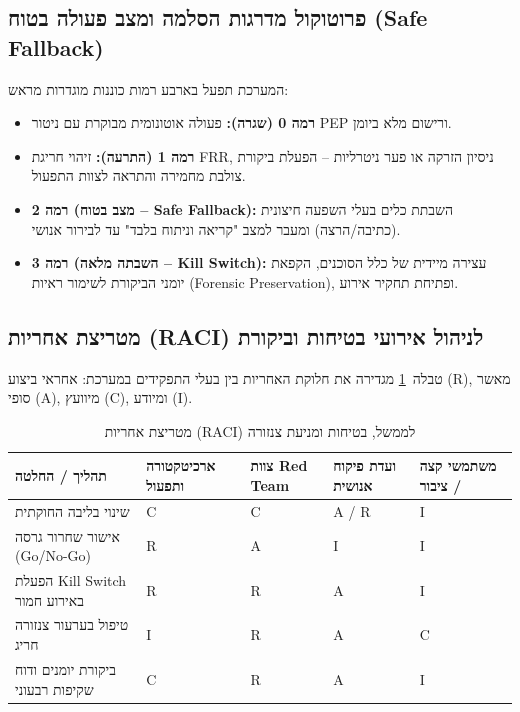 \subsection{פרוטוקול מדרגות הסלמה ומצב פעולה בטוח (\textenglish{Safe Fallback})}
המערכת תפעל בארבע רמות כוננות מוגדרות מראש:
\begin{itemize}
    \item \textbf{רמה 0 (שגרה):} פעולה אוטונומית מבוקרת עם ניטור \textenglish{PEP} ורישום מלא ביומן.
    \item \textbf{רמה 1 (התרעה):} זיהוי חריגת \textenglish{FRR}, ניסיון הזרקה או פער ניטרליות -- הפעלת ביקורת צולבת מחמירה והתראה לצוות התפעול.
    \item \textbf{רמה 2 (מצב בטוח -- \textenglish{Safe Fallback}):} השבתת כלים בעלי השפעה חיצונית (כתיבה/הרצה) ומעבר למצב "קריאה וניתוח בלבד" עד לבירור אנושי.
    \item \textbf{רמה 3 (השבתה מלאה -- \textenglish{Kill Switch}):} עצירה מיידית של כלל הסוכנים, הקפאת יומני הביקורת לשימור ראיות (\textenglish{Forensic Preservation}), ופתיחת תחקיר אירוע.
\end{itemize}

\subsection{מטריצת אחריות (\textenglish{RACI}) לניהול אירועי בטיחות וביקורת}
טבלה~\ref{tab:raci-governance} מגדירה את חלוקת האחריות בין בעלי התפקידים במערכת: אחראי ביצוע (\textenglish{R}), מאשר סופי (\textenglish{A}), מיוועץ (\textenglish{C}), ומיודע (\textenglish{I}).

\begin{table}[htbp]
\centering
\caption{מטריצת אחריות (\textenglish{RACI}) לממשל, בטיחות ומניעת צנזורה}
\label{tab:raci-governance}
\begin{tabular}{p{4.6cm} p{2.2cm} p{2.2cm} p{2.2cm} p{2.4cm}}
\toprule
\textbf{תהליך / החלטה} & \textbf{ארכיטקטורה ותפעול} & \textbf{צוות \textenglish{Red Team}} & \textbf{ועדת פיקוח אנושית} & \textbf{משתמשי קצה / ציבור} \\
\midrule
שינוי בליבה החוקתית & \textenglish{C} & \textenglish{C} & \textenglish{A / R} & \textenglish{I} \\
אישור שחרור גרסה (\textenglish{Go/No-Go}) & \textenglish{R} & \textenglish{A} & \textenglish{I} & \textenglish{I} \\
הפעלת \textenglish{Kill Switch} באירוע חמור & \textenglish{R} & \textenglish{R} & \textenglish{A} & \textenglish{I} \\
טיפול בערעור צנזורה חריג & \textenglish{I} & \textenglish{R} & \textenglish{A} & \textenglish{C} \\
ביקורת יומנים ודוח שקיפות רבעוני & \textenglish{C} & \textenglish{R} & \textenglish{A} & \textenglish{I} \\
\bottomrule
\end{tabular}
\end{table}

